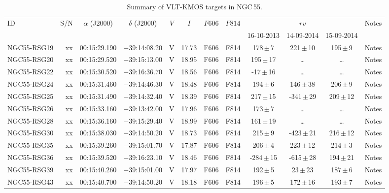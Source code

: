 \begin{table}
\caption[Summary of VLT-KMOS targets in NGC\,55]{Summary of VLT-KMOS targets in NGC\,55.\label{tb:n55obs-params}}
\scriptsize
\begin{threeparttable}
\centering
\begin{tabular}{lrcccccccccl}
 \hline
 \hline
ID & S/N & $\alpha$ (J2000) & $\delta$ (J2000) & $V$ & $I$ & $F606$ & $F814$ & \multicolumn{3}{c}{$rv$} (\kms) & Notes \\
& &  & & & & & & 16-10-2013 & 14-09-2014 & 15-09-2014\\

 \hline
NGC55-RSG19 & xx & 00:15:29.190 & $-$39:14:08.20& V & 17.73 & F606 & F814 & 178\,$\pm$\,7  & 221\,$\pm$\,10 & 195\,$\pm$\,9 & Notes\\
NGC55-RSG20 & xx & 00:15:29.520 & $-$39:15:13.00& V & 18.95 & F606 & F814 & 195\,$\pm$\,17 & \ldots & \ldots & Notes\\
NGC55-RSG22 & xx & 00:15:30.520 & $-$39:16:36.70& V & 18.56 & F606 & F814 & -17\,$\pm$\,16 & \ldots & \ldots & Notes\\
NGC55-RSG24 & xx & 00:15:31.460 & $-$39:14:46.30& V & 18.48 & F606 & F814 & 194\,$\pm$\,6  & 146\,$\pm$\,38 & 206\,$\pm$\,9 & Notes\\
NGC55-RSG25 & xx & 00:15:31.490 & $-$39:14:32.40& V & 18.39 & F606 & F814 & 217\,$\pm$\,15 & -341\,$\pm$\,29 & 209\,$\pm$\,12 & Notes\\
NGC55-RSG26 & xx & 00:15:33.160 & $-$39:13:42.00& V & 17.96 & F606 & F814 & 173\,$\pm$\,7  & \ldots & \ldots & Notes\\
NGC55-RSG28 & xx & 00:15:36.160 & $-$39:15:29.40& V & 18.99 & F606 & F814 & 161\,$\pm$\,19 & \ldots & \ldots & Notes\\
NGC55-RSG30 & xx & 00:15:38.030 & $-$39:14:50.20& V & 18.73 & F606 & F814 & 215\,$\pm$\,9  & -423\,$\pm$\,21 & 216\,$\pm$\,12 & Notes\\
NGC55-RSG35 & xx & 00:15:39.260 & $-$39:15:01.70& V & 17.87 & F606 & F814 & 206\,$\pm$\,4  & 223\,$\pm$\,12 & 214\,$\pm$\,3 & Notes\\
NGC55-RSG36 & xx & 00:15:39.520 & $-$39:16:23.10& V & 18.46 & F606 & F814 &-284\,$\pm$\,15 & -615\,$\pm$\,28 & 194\,$\pm$\,21 & Notes\\
NGC55-RSG39 & xx & 00:15:40.260 & $-$39:15:01.00& V & 17.97 & F606 & F814 & 192\,$\pm$\,5  & 23\,$\pm$\,23 & 187\,$\pm$\,6 & Notes\\
NGC55-RSG43 & xx & 00:15:40.700 & $-$39:14:50.20& V & 18.18 & F606 & F814 & 196\,$\pm$\,5  & 172\,$\pm$\,16 & 193\,$\pm$\,7 & Notes\\

\end{tabular}
\end{threeparttable}
\end{table}

